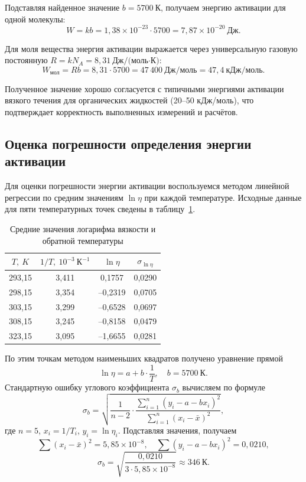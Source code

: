 \documentclass[a4paper, 12pt]{article}
\begin{document}
Подставляя найденное значение \(b = 5700\ \text{К}\), получаем энергию активации для одной молекулы:
\[
W = k b = 1{,}38\times 10^{-23} \cdot 5700 = 7{,}87\times 10^{-20}\ \text{Дж}.
\]


Для моля вещества энергия активации выражается через универсальную газовую постоянную \(R = k N_A = 8{,}31\ \text{Дж/(моль·К)}\):
\[
W_{\text{мол}} = R b = 8{,}31 \cdot 5700 = 47\,400\ \text{Дж/моль} = 47{,}4\ \text{кДж/моль}.
\]

Полученное значение хорошо согласуется с типичными энергиями активации вязкого течения для органических жидкостей (20–50 кДж/моль), что подтверждает корректность выполненных измерений и расчётов.

\subsection*{Оценка погрешности определения энергии активации}

Для оценки погрешности энергии активации воспользуемся методом линейной регрессии по средним значениям \(\ln\eta\) при каждой температуре. Исходные данные для пяти температурных точек сведены в таблицу~\ref{tab:means}.

\begin{table}[h!]
\centering
\caption{Средние значения логарифма вязкости и обратной температуры}
\label{tab:means}
\begin{tabular}{|c|c|c|c|}
\hline
\(T,\ K\) & \(1/T,\ 10^{-3}\ \text{К}^{-1}\) & \(\ln\eta\) & \(\sigma_{\ln\eta}\) \\
\hline
293,15 & 3,411 & 0,1757 & 0,0290 \\
298,15 & 3,354 & –0,2319 & 0,0705 \\
303,15 & 3,299 & –0,6528 & 0,0697 \\
308,15 & 3,245 & –0,8158 & 0,0479 \\
323,15 & 3,095 & –1,6655 & 0,0281 \\
\hline
\end{tabular}
\end{table}

По этим точкам методом наименьших квадратов получено уравнение прямой
\[
\ln\eta = a + b\cdot\frac{1}{T},\quad b = 5700\ \text{К}.
\]
Стандартную ошибку углового коэффициента \(\sigma_b\) вычисляем по формуле
\[
\sigma_b = \sqrt{\frac{1}{n-2}\cdot\frac{\sum_{i=1}^{n}(y_i-a-bx_i)^2}{\sum_{i=1}^{n}(x_i-\bar{x})^2}},
\]
где \(n=5\), \(x_i=1/T_i\), \(y_i=\ln\eta_i\). Подставляя значения, получаем
\[
\sum (x_i-\bar{x})^2 = 5{,}85\times 10^{-8},\quad \sum (y_i-a-bx_i)^2 = 0{,}0210,
\]
\[
\sigma_b = \sqrt{\frac{0{,}0210}{3\cdot5{,}85\times10^{-8}}} \approx 346\ \text{К}.
\]
\end{document}
